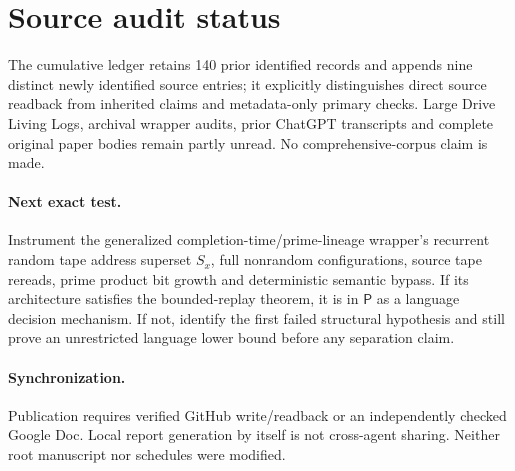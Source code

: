 \documentclass[11pt]{article}
\newcommand{\PP}{\mathsf{P}}
\begin{document}
\section{Source audit status}
The cumulative ledger retains 140 prior identified records and appends nine distinct newly identified source entries; it explicitly distinguishes direct source readback from inherited claims and metadata-only primary checks. Large Drive Living Logs, archival wrapper audits, prior ChatGPT transcripts and complete original paper bodies remain partly unread. No comprehensive-corpus claim is made.

\paragraph{Next exact test.} Instrument the generalized completion-time/prime-lineage wrapper's recurrent random tape address superset $S_x$, full nonrandom configurations, source tape rereads, prime product bit growth and deterministic semantic bypass. If its architecture satisfies the bounded-replay theorem, it is in $\PP$ as a language decision mechanism. If not, identify the first failed structural hypothesis and still prove an unrestricted language lower bound before any separation claim.

\paragraph{Synchronization.} Publication requires verified GitHub write/readback or an independently checked Google Doc. Local report generation by itself is not cross-agent sharing. Neither root manuscript nor schedules were modified.

\nocite{*}


\end{document}
